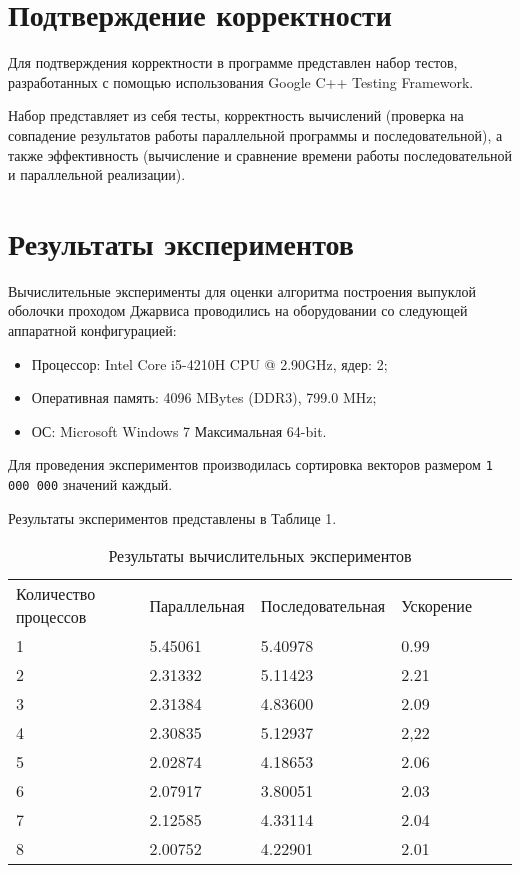 \documentclass{report}
\begin{document}
\section*{Подтверждение корректности}
Для подтверждения корректности в программе представлен набор тестов, разработанных с помощью использования Google C++ Testing Framework.
\par Набор представляет из себя тесты, корректность вычислений (проверка на совпадение результатов работы параллельной программы и последовательной), а также эффективность (вычисление и сравнение времени работы последовательной и параллельной реализации).
\newpage

\section*{Результаты экспериментов}
Вычислительные эксперименты для оценки алгоритма построения выпуклой оболочки проходом Джарвиса проводились на оборудовании со следующей аппаратной конфигурацией:

\begin{itemize}
\item Процессор: Intel Core i5-4210H CPU @ 2.90GHz, ядер: 2;
\item Оперативная память: 4096 MBytes (DDR3), 799.0 MHz;
\item ОС: Microsoft Windows 7 Максимальная 64-bit.
\end{itemize}

\par Для проведения экспериментов производилась сортировка векторов размером \verb|1 000 000| значений каждый. 
\par Результаты экспериментов представлены в Таблице 1.

\begin{table}[!h]
\caption{Результаты вычислительных экспериментов}
\centering
\begin{tabular}{llllll}
Количество процессов & Параллельная & Последовательная & Ускорение  \\
1        & 5.45061        & 5.40978      & 0.99                     \\
2        & 2.31332        & 5.11423      & 2.21                     \\
3        & 2.31384        & 4.83600      & 2.09                     \\
4        & 2.30835        & 5.12937      & 2,22                     \\
5        & 2.02874        & 4.18653      & 2.06                     \\
6        & 2.07917        & 3.80051      & 2.03                     \\
7        & 2.12585        & 4.33114      & 2.04                     \\
8        & 2.00752        & 4.22901      & 2.01      
\end{tabular}
\end{table}
\end{document}
